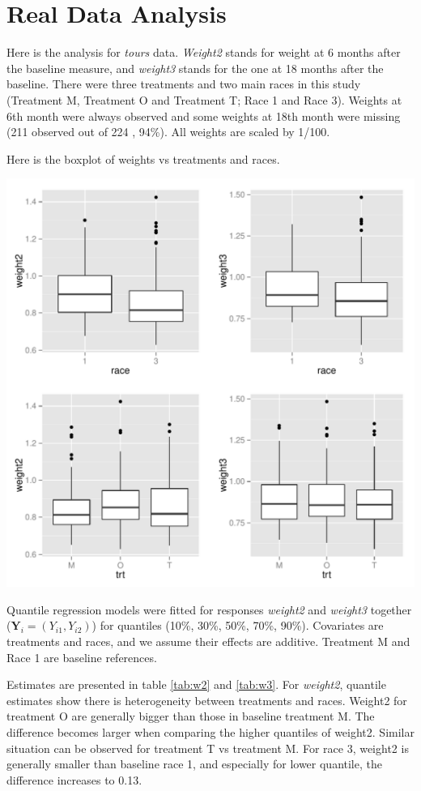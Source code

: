 \documentclass[12pt]{article}
\begin{document}
\section{Real Data Analysis}

Here is the analysis for \textit{tours} data. \textit{Weight2} stands for weight at 6 months after the baseline measure, and \textit{weight3} stands for the one at 18 months after the baseline. There were three treatments and two main races in this study (Treatment M, Treatment O and Treatment T; Race 1 and Race 3). Weights at 6th month were always observed and some weights at 18th month were missing (211 observed out of 224 , 94\%). All weights are scaled by 1/100.

Here is the boxplot of weights vs treatments and races. 

\includegraphics{../tours/weight-plot}

Quantile regression models were fitted for responses \textit{weight2} and \textit{weight3} together ($\bm Y_i = (Y_{i1}, Y_{i2})$) for quantiles (10\%, 30\%, 50\%, 70\%, 90\%). Covariates are treatments and races, and we assume their effects are additive. Treatment M and Race 1 are baseline references. 

Estimates are presented in table \ref{tab:w2} and \ref{tab:w3}. For \textit{weight2},  quantile estimates show there is heterogeneity between treatments and races. Weight2 for treatment O are generally bigger than those in baseline treatment M. The difference becomes larger when comparing the higher quantiles of weight2. Similar situation can be observed for treatment T vs treatment M. For race 3, weight2 is generally smaller than baseline race 1, and especially for lower quantile, the difference increases to 0.13. 
\end{document}

